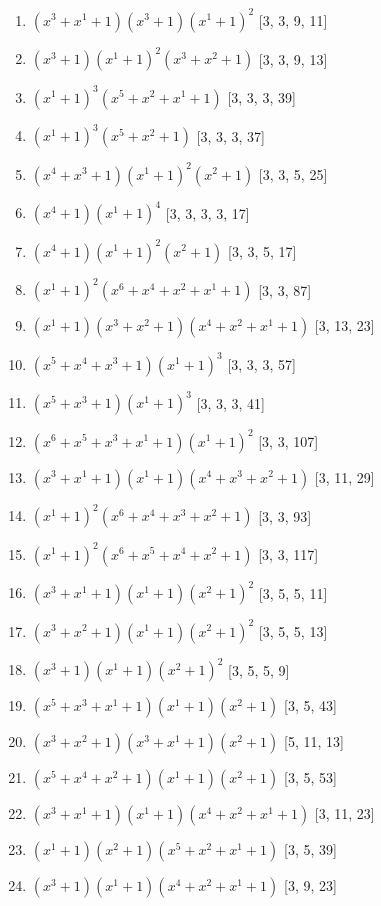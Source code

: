 \documentclass[10pt,twocolumn]{article}
\begin{document}
\begin{enumerate}
\item $(x^{3} + x^{1} + 1)(x^{3} + 1)(x^{1} + 1)^{2}$  [3, 3, 9, 11]
\item $(x^{3} + 1)(x^{1} + 1)^{2}(x^{3} + x^{2} + 1)$  [3, 3, 9, 13]
\item $(x^{1} + 1)^{3}(x^{5} + x^{2} + x^{1} + 1)$  [3, 3, 3, 39]
\item $(x^{1} + 1)^{3}(x^{5} + x^{2} + 1)$  [3, 3, 3, 37]
\item $(x^{4} + x^{3} + 1)(x^{1} + 1)^{2}(x^{2} + 1)$  [3, 3, 5, 25]
\item $(x^{4} + 1)(x^{1} + 1)^{4}$  [3, 3, 3, 3, 17]
\item $(x^{4} + 1)(x^{1} + 1)^{2}(x^{2} + 1)$  [3, 3, 5, 17]
\item $(x^{1} + 1)^{2}(x^{6} + x^{4} + x^{2} + x^{1} + 1)$  [3, 3, 87]
\item $(x^{1} + 1)(x^{3} + x^{2} + 1)(x^{4} + x^{2} + x^{1} + 1)$  [3, 13, 23]
\item $(x^{5} + x^{4} + x^{3} + 1)(x^{1} + 1)^{3}$  [3, 3, 3, 57]
\item $(x^{5} + x^{3} + 1)(x^{1} + 1)^{3}$  [3, 3, 3, 41]
\item $(x^{6} + x^{5} + x^{3} + x^{1} + 1)(x^{1} + 1)^{2}$  [3, 3, 107]
\item $(x^{3} + x^{1} + 1)(x^{1} + 1)(x^{4} + x^{3} + x^{2} + 1)$  [3, 11, 29]
\item $(x^{1} + 1)^{2}(x^{6} + x^{4} + x^{3} + x^{2} + 1)$  [3, 3, 93]
\item $(x^{1} + 1)^{2}(x^{6} + x^{5} + x^{4} + x^{2} + 1)$  [3, 3, 117]
\item $(x^{3} + x^{1} + 1)(x^{1} + 1)(x^{2} + 1)^{2}$  [3, 5, 5, 11]
\item $(x^{3} + x^{2} + 1)(x^{1} + 1)(x^{2} + 1)^{2}$  [3, 5, 5, 13]
\item $(x^{3} + 1)(x^{1} + 1)(x^{2} + 1)^{2}$  [3, 5, 5, 9]
\item $(x^{5} + x^{3} + x^{1} + 1)(x^{1} + 1)(x^{2} + 1)$  [3, 5, 43]
\item $(x^{3} + x^{2} + 1)(x^{3} + x^{1} + 1)(x^{2} + 1)$  [5, 11, 13]
\item $(x^{5} + x^{4} + x^{2} + 1)(x^{1} + 1)(x^{2} + 1)$  [3, 5, 53]
\item $(x^{3} + x^{1} + 1)(x^{1} + 1)(x^{4} + x^{2} + x^{1} + 1)$  [3, 11, 23]
\item $(x^{1} + 1)(x^{2} + 1)(x^{5} + x^{2} + x^{1} + 1)$  [3, 5, 39]
\item $(x^{3} + 1)(x^{1} + 1)(x^{4} + x^{2} + x^{1} + 1)$  [3, 9, 23]

\end{enumerate}
\end{document}
